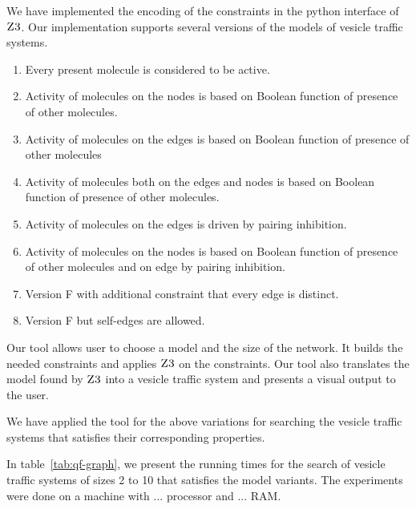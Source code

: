 We have implemented the encoding of the constraints
in the python interface of $\textsc{Z3}$.
%
Our implementation supports several versions of the
models of vesicle traffic systems.

\begin{enumerate}[label=\Alph*]
\item Every present molecule is considered to be active.
\item Activity of molecules on the nodes is based on Boolean function of presence of other molecules. 
\item Activity of molecules on the edges is based on Boolean function of presence of other molecules
\item Activity of molecules both on the edges and nodes is based on Boolean function of presence of other molecules.
\item Activity of molecules on the edges is driven by pairing inhibition.
\item Activity of molecules on the nodes is based on Boolean function of presence of other molecules and on edge by pairing inhibition.
\item Version F with additional constraint that every edge is distinct.
\item Version F but self-edges are allowed.
\end{enumerate}
%
Our tool allows user to choose a model and the size of
the network.
%
It builds the needed constraints and applies $\textsc{Z3}$
on the constraints.
%
Our tool also translates the model found by $\textsc{Z3}$
into a vesicle traffic system and presents a visual
output to the user.

We have applied the tool for the above variations
for searching the vesicle traffic systems that satisfies
their corresponding properties.




In table~\ref{tab:qf-graph}, we present the running times
for the search of vesicle traffic systems of sizes 2 to 10
that satisfies the model variants.
%
The experiments were done on a machine with ... processor 
and ... RAM.
%

